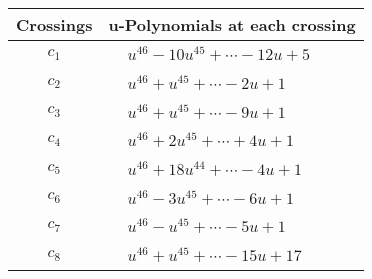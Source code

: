 \documentclass[1p]{elsarticle_modified}
\theoremstyle{definition}
\begin{document}
\begin{tabular}{m{50pt}|m{274pt}}
Crossings & \hspace{64pt}u-Polynomials at each crossing \\
\hline $$\begin{aligned}c_{1}\end{aligned}$$&$\begin{aligned}
&u^{46}-10 u^{45}+\cdots-12 u+5
\end{aligned}$\\
\hline $$\begin{aligned}c_{2}\end{aligned}$$&$\begin{aligned}
&u^{46}+u^{45}+\cdots-2 u+1
\end{aligned}$\\
\hline $$\begin{aligned}c_{3}\end{aligned}$$&$\begin{aligned}
&u^{46}+u^{45}+\cdots-9 u+1
\end{aligned}$\\
\hline $$\begin{aligned}c_{4}\end{aligned}$$&$\begin{aligned}
&u^{46}+2 u^{45}+\cdots+4 u+1
\end{aligned}$\\
\hline $$\begin{aligned}c_{5}\end{aligned}$$&$\begin{aligned}
&u^{46}+18 u^{44}+\cdots-4 u+1
\end{aligned}$\\
\hline $$\begin{aligned}c_{6}\end{aligned}$$&$\begin{aligned}
&u^{46}-3 u^{45}+\cdots-6 u+1
\end{aligned}$\\
\hline $$\begin{aligned}c_{7}\end{aligned}$$&$\begin{aligned}
&u^{46}- u^{45}+\cdots-5 u+1
\end{aligned}$\\
\hline $$\begin{aligned}c_{8}\end{aligned}$$&$\begin{aligned}
&u^{46}+u^{45}+\cdots-15 u+17
\end{aligned}$\\

\end{tabular}
\end{document}
